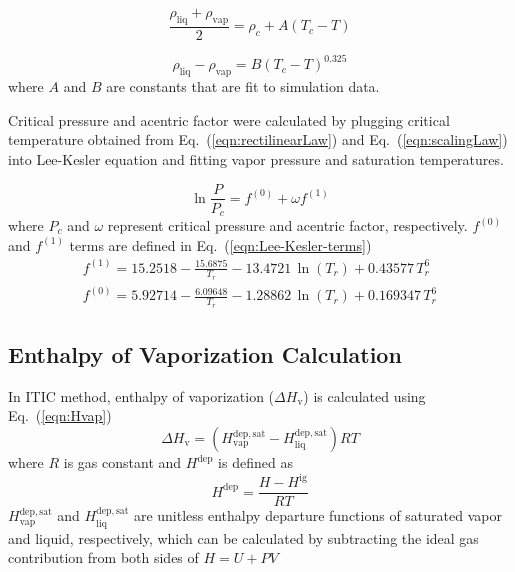 \documentclass[5p,times]{elsarticle}
\begin{document}
\begin{equation}
\frac{\rho_{\mathrm{liq}} +\rho_{\mathrm{vap}}}{2}=\rho_c+A(T_c-T)
\label{eqn:rectilinearLaw}
\end{equation}

\begin{equation}
\rho_{\mathrm{liq}} -\rho_{\mathrm{vap}}=B(T_c-T)^{0.325}
\label{eqn:scalingLaw}
\end{equation}
where $A$ and $B$ are constants that are fit to simulation data.

Critical pressure and acentric factor were calculated by plugging critical temperature obtained from Eq.~(\ref{eqn:rectilinearLaw}) and Eq.~(\ref{eqn:scalingLaw}) into Lee-Kesler equation \cite{Lee1975} and fitting vapor pressure and saturation temperatures.
			
\begin{equation}
{\ln \frac{P}{P_c}=f^{(0)}+\omega f^{(1)}} 
\label{eqn:Lee-Kesler}
\end{equation}
where $P_c$ and $\omega$ represent critical pressure and acentric factor, respectively. $f^{(0)}$ and $f^{(1)}$ terms are defined in Eq.~(\ref{eqn:Lee-Kesler-terms})
\begin{equation}
\begin{array}{l} 
{f^{(1)} = 15.2518 - \frac{15.6875}{T_r} - 13.4721 \, \ln(T_r) +   0.43577 \, T_r^6 } \\ 
{ f^{(0)} = 5.92714 - \frac{6.09648}{T_r} - 1.28862 \, \ln(T_r) + 0.169347 \, T_r^6  } 
\end{array} \label{eqn:Lee-Kesler-terms}
\end{equation}
	
\subsection{Enthalpy of Vaporization Calculation}\label{sec:HvapCalc}
In ITIC method, enthalpy of vaporization ($\Delta H_\mathrm{v}$) is calculated using Eq.~(\ref{eqn:Hvap})
\begin{equation}
\Delta H_\mathrm{v}= ( H^{\mathrm{dep,sat}}_\mathrm{vap} - H^{\mathrm{dep,sat}}_\mathrm{liq})RT
\label{eqn:Hvap}
\end{equation}
where $R$ is gas constant and $H^{\mathrm{dep}}$ is defined as
\begin{equation}
H^{\mathrm{dep}}=\frac{H-H^{\mathrm{ig}}}{RT}
\label{hdep}
\end{equation}
$H^{\mathrm{dep,sat}}_\mathrm{vap}$ and $H^{\mathrm{dep,sat}}_\mathrm{liq}$ are unitless enthalpy departure functions of saturated vapor and liquid, respectively, which can be calculated by subtracting the ideal gas contribution from both sides of $H=U+PV$
\end{document}
